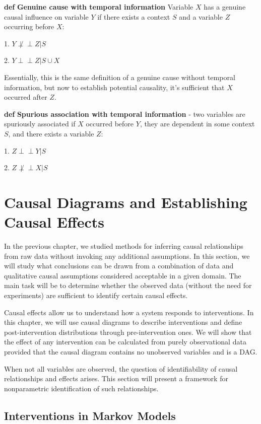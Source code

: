 \documentclass[fleqn]{article}
\newcommand{\independent}{\perp \!\!\! \perp}
\def\define#1{\textbf{def} \textbf{#1}}
\numberwithin{equation}{section}
\numberwithin{theorem}{section}
\numberwithin{figure}{section}
\numberwithin{lemma}{section}
\numberwithin{corollary}{section}
\begin{document}
\define{Genuine cause with temporal information} Variable $X$ has a genuine causal influence on variable $Y$ if there exists a context $S$ and a variable $Z$ occurring before $X$:

1. $Y \not \independent Z | S$

2. $Y \independent Z | S \cup X$

Essentially, this is the same definition of a genuine cause without temporal information, but now to establish potential causality, it's sufficient that $X$ occurred after $Z$.

\define{Spurious association with temporal information} - two variables are spuriously associated if $X$ occurred before $Y$, they are dependent in some context $S$, and there exists a variable $Z$:

1. $Z \independent Y | S$

2. $Z \not \independent X | S$

\section{Causal Diagrams and Establishing Causal Effects}

In the previous chapter, we studied methods for inferring causal relationships from raw data without invoking any additional assumptions. In this section, we will study what conclusions can be drawn from a combination of data and qualitative causal assumptions considered acceptable in a given domain. The main task will be to determine whether the observed data (without the need for experiments) are sufficient to identify certain causal effects.

Causal effects allow us to understand how a system responds to interventions. In this chapter, we will use causal diagrams to describe interventions and define post-intervention distributions through pre-intervention ones. We will show that the effect of any intervention can be calculated from purely observational data provided that the causal diagram contains no unobserved variables and is a DAG.

When not all variables are observed, the question of identifiability of causal relationships and effects arises. This section will present a framework for nonparametric identification of such relationships.

\subsection*{Interventions in Markov Models}
\end{document}
